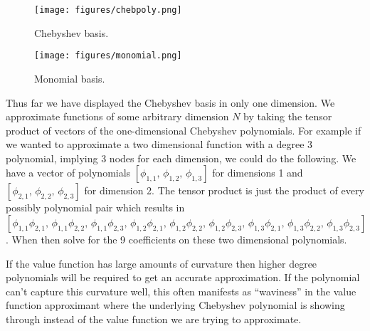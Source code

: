 \documentclass[11pt]{article}%
\begin{document}
\begin{figure}[]
	\begin{minipage}[c]{\linewidth}
			\centering \texttt{[image: figures/chebpoly.png]}
	\end{minipage}%
	\caption{Chebyshev basis.}
	\label{fig:cheb}
\end{figure}

\begin{figure}[]
	\begin{minipage}[c]{\linewidth}
			\centering \texttt{[image: figures/monomial.png]}
	\end{minipage}%
	\caption{Monomial basis.}
	\label{fig:mono}
\end{figure}

Thus far we have displayed the Chebyshev basis in only one dimension. We approximate functions of some arbitrary dimension $N$ by taking the tensor product of vectors of the one-dimensional Chebyshev polynomials. For example if we wanted to approximate a two dimensional function with a degree 3 polynomial, implying 3 nodes for each dimension, we could do the following. We have a vector of polynomials $[\phi_{1,1}, \, \phi_{1,2}, \, \phi_{1,3}]$ for dimensions 1 and $[\phi_{2,1}, \, \phi_{2,2}, \, \phi_{2,3}]$ for dimension 2. The tensor product is just the product of every possibly polynomial pair which results in $[\phi_{1,1}\phi_{2,1} ,\, \phi_{1,1}\phi_{2,2}, \, \phi_{1,1}\phi_{2,3}, \, \phi_{1,2}\phi_{2,1}, \, \phi_{1,2}\phi_{2,2}, \, \phi_{1,2}\phi_{2,3}, \, \phi_{1,3}\phi_{2,1}, \, \phi_{1,3}\phi_{2,2}, \, \phi_{1,3}\phi_{2,3}]$. When then solve for the 9 coefficients on these two dimensional polynomials. 

If the value function has large amounts of curvature then higher degree polynomials will be required to get an accurate approximation. If the polynomial can't capture this curvature well, this often manifests as ``waviness'' in the value function approximant where the underlying Chebyshev polynomial is showing through instead of the value function we are trying to approximate.
\end{document}
